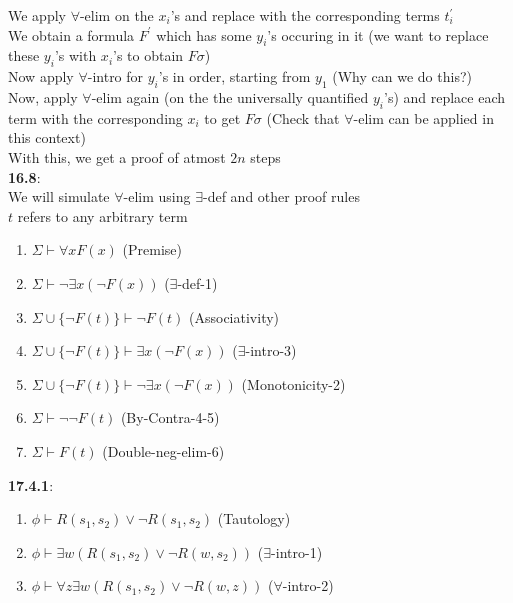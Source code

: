 \documentclass{article}
\begin{document}
\begin{flushleft}
We apply $\forall$-elim on the $x_i$'s and replace with the corresponding terms $t_i^{'}$\\
We obtain a formula $F^{'}$ which has some $y_i$'s occuring in it (we want to replace these $y_i$'s with $x_i$'s to obtain $F\sigma$)\\
Now apply $\forall$-intro for $y_i$'s in order, starting from $y_1$ (Why can we do this?)\\
Now, apply $\forall$-elim again (on the the universally quantified $y_i$'s) and replace each term with the corresponding $x_i$ to get $F\sigma$ (Check that $\forall$-elim can be applied in this context)\\
With this, we get a proof of atmost $2n$ steps\\
\textbf{16.8}: \\
We will simulate $\forall$-elim using $\exists$-def and other proof rules\\
$t$ refers to any arbitrary term \\
\begin{enumerate}
    \item $\Sigma \vdash \forall x F(x)$ \hspace{2mm} (Premise)
    \item $\Sigma \vdash \neg \exists x (\neg F(x))$ \hspace{2mm} ($\exists$-def-1)
    \item $\Sigma \cup \{{\neg F(t)}\} \vdash \neg F(t)$ \hspace{2mm} (Associativity)
    \item $\Sigma \cup \{{\neg F(t)}\} \vdash \exists x (\neg F(x))$ \hspace{2mm} ($\exists$-intro-3)
    \item $\Sigma \cup \{{\neg F(t)}\} \vdash \neg \exists x(\neg F(x))$ \hspace{2mm} (Monotonicity-2)
    \item $\Sigma \vdash \neg \neg F(t)$  \hspace{2mm} (By-Contra-4-5)
    \item  $\Sigma \vdash F(t)$  \hspace{2mm} (Double-neg-elim-6)
\end{enumerate}
\textbf{17.4.1}: \\
\begin{enumerate}
    \item $ \phi \vdash R(s_1,s_2) \vee \neg R(s_1,s_2)$ \hspace{2mm} (Tautology)
    \item $\phi \vdash \exists w (R(s_1,s_2)\vee \neg R(w,s_2))$ \hspace{2mm} ($\exists$-intro-1)
    \item $\phi \vdash \forall z \exists w (R(s_1,s_2)\vee \neg R(w,z))$ \hspace{2mm} ($\forall$-intro-2)
\end{enumerate}
\end{flushleft}
\end{document}
